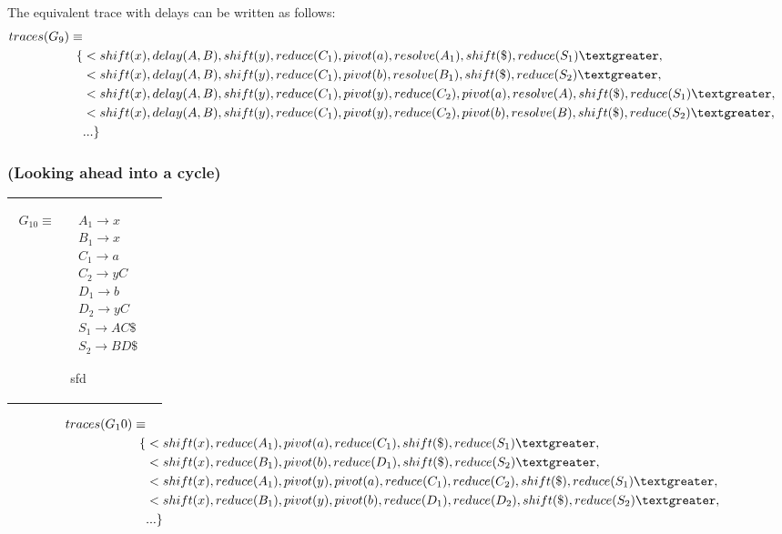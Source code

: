 \documentclass[11pt]{article}
\begin{document}
The equivalent trace with delays can be written as follows:
\begin{align*}
traces(G_9) \equiv \\
\{ & \textless shift(x), delay(A,B), shift(y), reduce(C_1), pivot(a), resolve(A_1), shift(\$), reduce(S_1) \textgreater,\\
                      & \textless shift(x), delay(A,B), shift(y), reduce(C_1), pivot(b), resolve(B_1), shift(\$), reduce(S_2) \textgreater,\\
                      & \textless shift(x), delay(A,B), shift(y), reduce(C_1), pivot(y), reduce(C_2), pivot(a), resolve(A), shift(\$), reduce(S_1) \textgreater,\\
                      & \textless shift(x), delay(A,B), shift(y), reduce(C_1), pivot(y), reduce(C_2), pivot(b), resolve(B), shift(\$), reduce(S_2) \textgreater,\\
                      & ... \}
\end{align*}



\subsubsection{(Looking ahead into a cycle)}
\begin{tabular}[t]{cl}
\parbox{.3\textwidth}{
\begin{align*}
G_10 \equiv \quad & A_1 \rightarrow x\\
                  & B_1 \rightarrow x\\
                  & C_1 \rightarrow a\\
                  & C_2 \rightarrow y C\\
                  & D_1 \rightarrow b\\
                  & D_2 \rightarrow y C\\
                  & S_1 \rightarrow A C \$\\
                  & S_2 \rightarrow B D \$
\end{align*}}
\parbox{.8\textwidth}{sfd}
\end{tabular}

\begin{align*}
traces(G_10) \equiv \\
\{ & \textless shift(x), reduce(A_1), pivot(a), reduce(C_1), shift(\$), reduce(S_1) \textgreater,\\
                       & \textless shift(x), reduce(B_1), pivot(b), reduce(D_1), shift(\$), reduce(S_2) \textgreater,\\
                       & \textless shift(x), reduce(A_1), pivot(y), pivot(a), reduce(C_1), reduce(C_2), shift(\$), reduce(S_1) \textgreater,\\
                       & \textless shift(x), reduce(B_1), pivot(y), pivot(b), reduce(D_1), reduce(D_2), shift(\$), reduce(S_2) \textgreater,\\
                       & ... \}
\end{align*}
\end{document}
